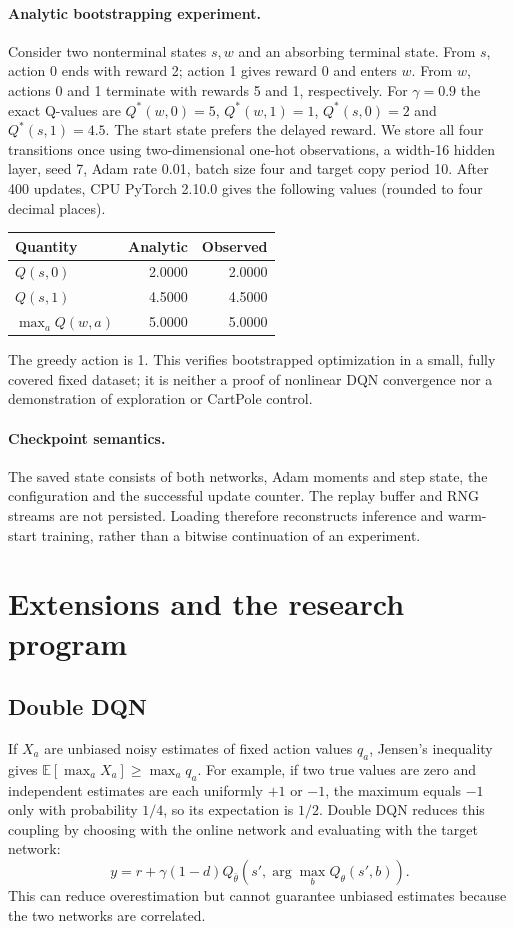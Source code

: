 \documentclass[11pt,a4paper]{article}
\newcommand{\E}{\mathbb E}
\begin{document}
\paragraph{Analytic bootstrapping experiment.}
Consider two nonterminal states $s,w$ and an absorbing terminal state. From $s$,
action 0 ends with reward 2; action 1 gives reward 0 and enters $w$.
From $w$, actions 0 and 1 terminate with rewards 5 and 1, respectively.
For $\gamma=0.9$ the exact Q-values are $Q^*(w,0)=5$, $Q^*(w,1)=1$,
$Q^*(s,0)=2$ and $Q^*(s,1)=4.5$. The start state prefers the delayed reward.
We store all four transitions once using two-dimensional one-hot observations,
a width-16 hidden layer, seed 7, Adam rate 0.01, batch size four and target
copy period 10. After 400 updates, CPU PyTorch 2.10.0 gives the following values
(rounded to four decimal places).
\begin{center}
\begin{tabular}{lrr}
\toprule Quantity & Analytic & Observed \\
\midrule
$Q(s,0)$ & 2.0000 & 2.0000 \\
$Q(s,1)$ & 4.5000 & 4.5000 \\
$\max_a Q(w,a)$ & 5.0000 & 5.0000 \\
\bottomrule
\end{tabular}
\end{center}
The greedy action is 1. This verifies bootstrapped optimization in a small,
fully covered fixed dataset; it is neither a proof of nonlinear DQN convergence
nor a demonstration of exploration or CartPole control.

\paragraph{Checkpoint semantics.}
The saved state consists of both networks, Adam moments and step state, the
configuration and the successful update counter. The replay buffer and RNG
streams are not persisted. Loading therefore reconstructs inference and
warm-start training, rather than a bitwise continuation of an experiment.

\section{Extensions and the research program}
\subsection{Double DQN}
If $X_a$ are unbiased noisy estimates of fixed action values $q_a$, Jensen's inequality gives $\E[\max_a X_a]\geq\max_a q_a$. For example, if two true values are zero and independent estimates are each uniformly $+1$ or $-1$, the maximum equals $-1$ only with probability $1/4$, so its expectation is $1/2$. Double DQN \cite{double} reduces this coupling by choosing with the online network and evaluating with the target network:
\[
 y=r+\gamma(1-d)Q_{\bar\theta}(s',\arg\max_b Q_\theta(s',b)).
\]
This can reduce overestimation but cannot guarantee unbiased estimates because the two networks are correlated.
\end{document}
